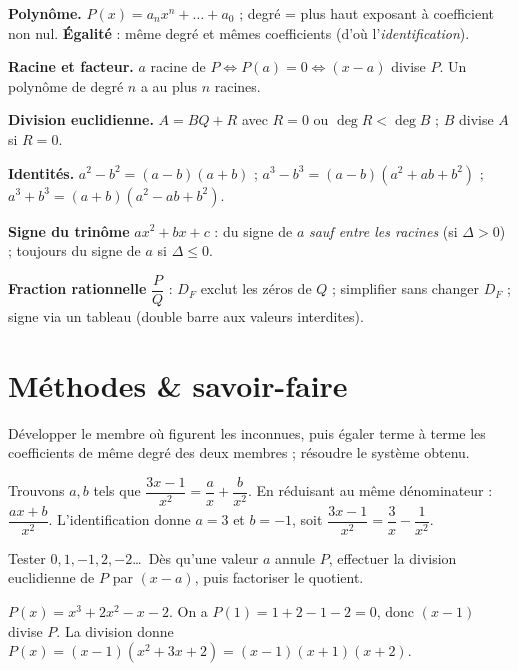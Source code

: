 \begin{synthese}
\textbf{Polynôme.} $P(x)=a_n x^n+\dots+a_0$ ; degré = plus haut exposant à coefficient
non nul. \textbf{Égalité} : même degré et mêmes coefficients (d'où l'\emph{identification}).

\smallskip
\textbf{Racine et facteur.} $a$ racine de $P \iff P(a)=0 \iff (x-a)$ divise $P$.
Un polynôme de degré $n$ a au plus $n$ racines.

\smallskip
\textbf{Division euclidienne.} $A=BQ+R$ avec $R=0$ ou $\deg R<\deg B$ ; $B$ divise $A$ si $R=0$.

\smallskip
\textbf{Identités.} $a^2-b^2=(a-b)(a+b)$ ; $a^3-b^3=(a-b)(a^2+ab+b^2)$ ;
$a^3+b^3=(a+b)(a^2-ab+b^2)$.

\smallskip
\textbf{Signe du trinôme} $ax^2+bx+c$ : du signe de $a$ \emph{sauf entre les racines}
(si $\Delta>0$) ; toujours du signe de $a$ si $\Delta\le 0$.

\smallskip
\textbf{Fraction rationnelle} $\dfrac{P}{Q}$ : $D_F$ exclut les zéros de $Q$ ;
simplifier sans changer $D_F$ ; signe via un tableau (double barre aux valeurs interdites).
\end{synthese}

\section{Méthodes \& savoir-faire}

Développer le membre où figurent les inconnues, puis égaler terme à terme les
coefficients de même degré des deux membres ; résoudre le système obtenu.
\begin{exemple}
Trouvons $a,b$ tels que $\dfrac{3x-1}{x^2}=\dfrac{a}{x}+\dfrac{b}{x^2}$. En réduisant au
même dénominateur : $\dfrac{ax+b}{x^2}$. L'identification donne $a=3$ et $b=-1$, soit
$\dfrac{3x-1}{x^2}=\dfrac{3}{x}-\dfrac{1}{x^2}$.
\end{exemple}

Tester $0,1,-1,2,-2$\dots\ Dès qu'une valeur $a$ annule $P$, effectuer la division
euclidienne de $P$ par $(x-a)$, puis factoriser le quotient.
\begin{exemple}
$P(x)=x^3+2x^2-x-2$. On a $P(1)=1+2-1-2=0$, donc $(x-1)$ divise $P$. La division donne
$P(x)=(x-1)(x^2+3x+2)=(x-1)(x+1)(x+2)$.
\end{exemple}

